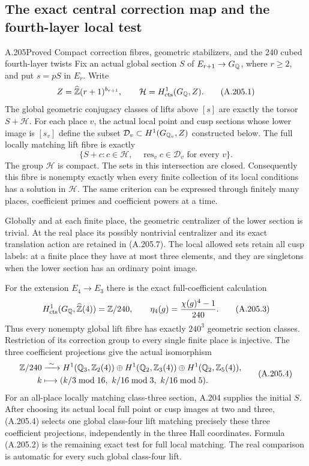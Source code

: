 \subsection{The exact central correction map and the fourth-layer local test}

\begin{statement}{A.205}{Proved}
{Compact correction fibres, geometric stabilizers, and the 240 cubed fourth-layer twists}
Fix an actual global section \(S\) of \(E_{r+1}\to G_\mathbb Q\),
where \(r\geq2\), and put \(s=pS\) in \(E_r\).
Write
\[
 Z=\widehat{\mathbb Z}(r+1)^{b_{r+1}},\qquad
 \mathcal H=H^1_{\rm cts}(G_\mathbb Q,Z).
\tag{A.205.1}
\]
The global geometric conjugacy classes of lifts above \([s]\)
are exactly the torsor \(S+\mathcal H\).
For each place \(v\), the actual local point and cusp sections
whose lower image is \([s_v]\) define the subset
\(\mathcal D_v\subset H^1(G_{\mathbb Q_v},Z)\) constructed below.
The full locally matching lift fibre is exactly
\[
 \{S+c:c\in\mathcal H,\quad
                   \operatorname{res}_v c\in\mathcal D_v
                      \text{ for every }v\}.
\tag{A.205.2}
\]
The group \(\mathcal H\) is compact.  The sets in this
intersection are closed.  Consequently this fibre is nonempty
exactly when every finite collection of its local conditions
has a solution in \(\mathcal H\).
The same criterion can be expressed through finitely many
places, coefficient primes and coefficient powers at a time.

Globally and at each finite place, the geometric centralizer
of the lower section is trivial.  At the real place its
possibly nontrivial centralizer and its exact translation
action are retained in (A.205.7).  The local allowed sets
retain all cusp labels: at a finite place they have at most
three elements, and they are singletons when the lower
section has an ordinary point image.

For the extension \(E_4\to E_3\) there is the exact
full-coefficient calculation
\[
 H^1_{\rm cts}(G_\mathbb Q,\widehat{\mathbb Z}(4))=\mathbb Z/240,
 \qquad \eta_4(g)=\frac{\chi(g)^4-1}{240}.
\tag{A.205.3}
\]
Thus every nonempty global lift fibre has exactly \(240^3\)
geometric section classes.  Restriction of its correction
group to every single finite place is injective.
The three coefficient projections give the actual isomorphism
\[
\begin{aligned}
 \mathbb Z/240&\xrightarrow{\ \sim\ }
 H^1(\mathbb Q_3,\mathbb Z_2(4))\oplus H^1(\mathbb Q_2,\mathbb Z_3(4))
                              \oplus H^1(\mathbb Q_2,\mathbb Z_5(4)),\\
 k&\longmapsto(k/3\bmod16,\ k/16\bmod3,\ k/16\bmod5).
\end{aligned}
\tag{A.205.4}
\]
For an all-place locally matching class-three section, A.204
supplies the initial \(S\).  After choosing its actual local
full point or cusp images at two and three, (A.205.4) selects
one global class-four lift matching precisely these three
coefficient projections, independently in the three Hall
coordinates.  Formula (A.205.2) is the remaining exact test
for full local matching.  The real comparison is automatic
for every such global class-four lift.


\end{statement}
